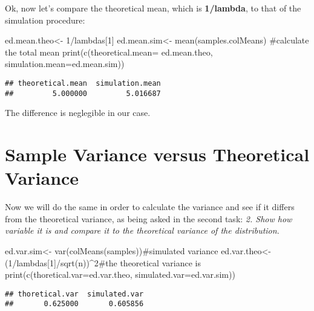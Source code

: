 \documentclass[]{article}
\newenvironment{Shaded}{}{}
\newcommand{\KeywordTok}[1]{\textcolor[rgb]{0.00,0.00,1.00}{{#1}}}
\newcommand{\DataTypeTok}[1]{{#1}}
\newcommand{\DecValTok}[1]{{#1}}
\newcommand{\StringTok}[1]{\textcolor[rgb]{0.00,0.50,0.50}{{#1}}}
\newcommand{\CommentTok}[1]{\textcolor[rgb]{0.00,0.50,0.00}{{#1}}}
\newcommand{\NormalTok}[1]{{#1}}
\begin{document}
Ok, now let's compare the theoretical mean, which is \textbf{1/lambda},
to that of the simulation procedure:

\begin{Shaded}
\begin{Highlighting}[]
\NormalTok{ed.mean.theo<-}\StringTok{ }\DecValTok{1}\NormalTok{/lambdas[}\DecValTok{1}\NormalTok{]}
\NormalTok{ed.mean.sim<-}\StringTok{ }\KeywordTok{mean}\NormalTok{(samples.colMeans) }\CommentTok{#calculate the total mean}
\KeywordTok{print}\NormalTok{(}\KeywordTok{c}\NormalTok{(}\DataTypeTok{theoretical.mean=} \NormalTok{ed.mean.theo, }\DataTypeTok{simulation.mean=}\NormalTok{ed.mean.sim))}
\end{Highlighting}
\end{Shaded}

\begin{verbatim}
## theoretical.mean  simulation.mean 
##         5.000000         5.016687
\end{verbatim}

The difference is neglegible in our case.

\section{Sample Variance versus Theoretical
Variance}\label{sample-variance-versus-theoretical-variance}

Now we will do the same in order to calculate the variance and see if it
differs from the theoretical variance, as being asked in the second
task: \emph{2. Show how variable it is and compare it to the theoretical
variance of the distribution.}

\begin{Shaded}
\begin{Highlighting}[]
\NormalTok{ed.var.sim<-}\StringTok{ }\KeywordTok{var}\NormalTok{(}\KeywordTok{colMeans}\NormalTok{(samples))}\CommentTok{#simulated variance}
\NormalTok{ed.var.theo<-}\StringTok{ }\NormalTok{(}\DecValTok{1}\NormalTok{/lambdas[}\DecValTok{1}\NormalTok{]/}\KeywordTok{sqrt}\NormalTok{(n))^}\DecValTok{2}\CommentTok{#the theoretical variance is}
\KeywordTok{print}\NormalTok{(}\KeywordTok{c}\NormalTok{(}\DataTypeTok{thoretical.var=}\NormalTok{ed.var.theo, }\DataTypeTok{simulated.var=}\NormalTok{ed.var.sim))}
\end{Highlighting}
\end{Shaded}

\begin{verbatim}
## thoretical.var  simulated.var 
##       0.625000       0.605856
\end{verbatim}
\end{document}
